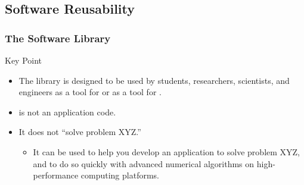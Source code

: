  

\subsection{Software Reusability}
\frame
{
  \frametitle{The \libmesh{} Software Library}

  \begin{block}{Key Point}
    \begin{itemize}
      \item The \libmesh{} library is designed to be used by students, researchers, scientists, and engineers as a tool for  or as a tool for .
      \item \libMesh{} is not an application code.
      \item It does not ``solve problem XYZ.''
        \begin{itemize}
          \item It can be used to help you develop an application to solve problem XYZ, and to do so quickly with advanced numerical algorithms on high-performance computing platforms.
        \end{itemize}
    \end{itemize}    
  \end{block}
} 



